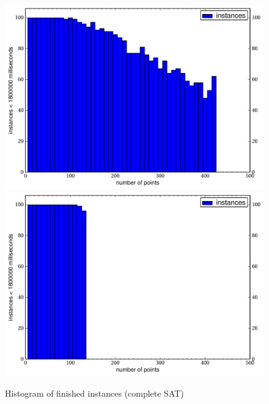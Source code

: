 \begin{figure}[ht]
  \centering
  \includegraphics[width=\linewidth,height=0.4\textheight,keepaspectratio]{results/time_hist.pdf}
%
  \includegraphics[width=\linewidth,height=0.4\textheight,keepaspectratio]{results/complete_sat/time_hist.pdf}
  \caption{Histogram of finished instances (complete SAT)}
\end{figure}
